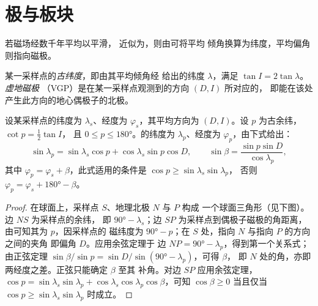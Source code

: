 \section{极与板块}

若磁场经数千年平均以平滑，
近似为，则由可将平均
倾角换算为纬度，平均偏角则指向磁极。

\begin{definition}\label{def:b3:palaeomagnetism:vgp}
某一采样点的\emph{古纬度}，即由其平均倾角经
给出的纬度 $\lambda$，满足 $\tan I =
2\tan\lambda$。\emph{虚地磁极}
（VGP）是在某一采样点观测到的方向 $(D, I)$ 所对应的，
即能在该处产生此方向的地心偶极子的北极。
\end{definition}

\begin{theorem}[方向的极]\label{thm:b3:palaeomagnetism:pole}
设某采样点的纬度为 $\lambda_s$、经度为 $\varphi_s$，其平均方向为
$(D, I)$。设 $p$ 为古余纬，$\cot p = \tfrac12\tan I$，
且 $0 \le p \le \ang{180}$。的纬度为
$\lambda_p$、经度为 $\varphi_p$，由下式给出：
\[
  \sin\lambda_p = \sin\lambda_s\cos p + \cos\lambda_s\sin p\cos D,\qquad
  \sin\beta = \frac{\sin p\sin D}{\cos\lambda_p},
\]
其中 $\varphi_p = \varphi_s + \beta$，此式适用的条件是 $\cos p \ge \sin\lambda_s\sin\lambda_p$，
否则 $\varphi_p = \varphi_s + \ang{180} - \beta$。
\end{theorem}

\begin{proof}
在球面上，采样点 $S$、地理北极 $N$ 与 $P$ 构成
一个球面三角形（见下图）。边 $NS$ 为采样点的余纬，
即 $\ang{90} - \lambda_s$；边 $SP$ 为采样点到偶极子磁极的角距离，
由可知其为 $p$，因采样点的
磁纬度为 $\ang{90} - p$；在 $S$ 处，指向 $N$ 与指向 $P$ 的方向之间的夹角
即偏角 $D$。应用余弦定理于
边 $NP = \ang{90} - \lambda_p$，得到第一个关系式；由正弦定理
$\sin\beta/\sin p = \sin D/\sin(\ang{90} - \lambda_p)$，可得 $\beta$，
即 $N$ 处的角，亦即两经度之差。正弦只能确定 $\beta$ 至其
补角。对边 $SP$ 应用余弦定理，$\cos p = \sin\lambda_s
\sin\lambda_p + \cos\lambda_s\cos\lambda_p\cos\beta$，可知 $\cos\beta \ge
0$ 当且仅当 $\cos p \ge \sin\lambda_s\sin\lambda_p$ 时成立。
\end{proof}

